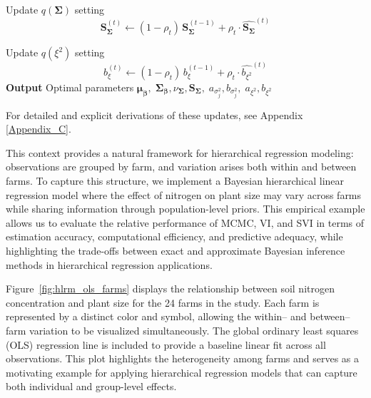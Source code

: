 \begin{algorithm}[H]
\begin{algorithmic}
  \State Update $q (\bm{\Sigma})$ setting
  $$
  \bm{S}_{\bm{\Sigma}}^{(t)} \leftarrow (1-\rho_t)\,\bm{S}_{\bm{\Sigma}}^{(t-1)} + \rho_t \cdot \hat{\bm{S}_{\bm{\bm{\Sigma}}}}^{(t)}
  $$
  
  \State Update $q (\xi^2)$ setting
  $$
  b_{\xi}^{(t)} \leftarrow (1-\rho_t)\,b_{\xi}^{(t-1)} + \rho_t \cdot \hat{b_{\xi^2}}^{(t)}
  $$
\EndFor
\State \textbf{Output} Optimal parameters $
\bm{\mu}_{\bm{\beta}},\; \bm{\Sigma}_{\bm{\beta}},\nu_{\bm{\Sigma}}, \bm{S}_{\bm{\Sigma}},\; a_{\sigma_j^2}, b_{\sigma_j^2},\; a_{\xi^2}, b_{\xi^2}$
\end{algorithmic}
\label{SVI_HLRM_alg}
\end{algorithm}

For detailed and explicit derivations of these updates, see Appendix \ref{Appendix_C}.

\newpage

This context provides a natural framework for hierarchical regression modeling: 
observations are grouped by farm, and variation arises both within and between farms. 
To capture this structure, we implement a Bayesian hierarchical linear regression 
model where the effect of nitrogen on plant size may vary across farms while 
sharing information through population-level priors. This empirical example allows us to evaluate the relative performance of MCMC, VI, 
and SVI in terms of estimation accuracy, computational efficiency, and predictive 
adequacy, while highlighting the trade-offs between exact and approximate Bayesian 
inference methods in hierarchical regression applications.

\vspace{0.5cm}

Figure~\ref{fig:hlrm_ols_farms} displays the relationship between soil nitrogen concentration and plant size for the 24 farms in the study. Each farm is represented by a distinct color and symbol, allowing the within-- and between--farm variation to be visualized simultaneously. 
The global ordinary least squares (OLS) regression line is included to provide a baseline linear fit across all observations. 
This plot highlights the heterogeneity among farms and serves as a motivating example for applying hierarchical regression models that can capture both individual and group-level effects.

